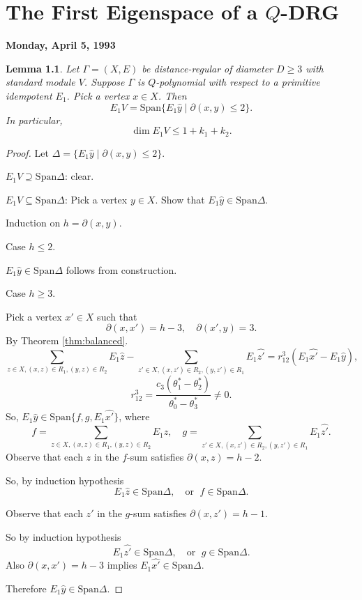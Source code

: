 \documentclass[
]{book}
\newtheorem{lemma}{Lemma}[chapter]
\theoremstyle{definition}
\theoremstyle{definition}
\theoremstyle{definition}
\theoremstyle{definition}
\theoremstyle{remark}
\begin{document}
\hypertarget{lec28}{%
\chapter{\texorpdfstring{The First Eigenspace of a \(Q\)-DRG}{The First Eigenspace of a Q-DRG}}\label{lec28}}

\textbf{Monday, April 5, 1993}

\begin{lemma}
\protect\hypertarget{lem:EV}{}\label{lem:EV}Let \(\Gamma = (X,E)\) be distance-regular of diameter \(D\geq 3\) with standard module \(V\). Suppose \(\Gamma\) is \(Q\)-polynomial with respect to a primitive idempotent \(E_1\). Pick a vertex \(x\in X\). Then
\[E_1V = \mathrm{Span}\{E_1\hat{y}\mid \partial(x,y)\leq 2\}.\]
In particular,
\[\dim E_1V \leq 1 + k_1 + k_2.\]
\end{lemma}

\begin{proof}
Let \(\Delta = \{E_1\hat{y}\mid \partial(x,y)\leq 2\}\).

\(E_1V \supseteq \mathrm{Span}\Delta\): clear.

\(E_1V \subseteq \mathrm{Span}\Delta\): Pick a vertex \(y\in X\). Show that \(E_1\hat{y}\in \mathrm{Span}\Delta\).

Induction on \(h = \partial(x,y)\).

Case \(h\leq 2\).

\(E_1\hat{y} \in \mathrm{Span}\Delta\) follows from construction.

Case \(h\geq 3\).

Pick a vertex \(x'\in X\) such that
\[\partial(x,x') = h-3, \quad \partial(x',y) = 3.\]
By Theorem \ref{thm:balanced}.
\[\sum_{z\in X, (x,z)\in R_1, (y,z)\in R_2}E_1\hat{z} - \sum_{z'\in X, (x,z')\in R_2, (y,z')\in R_1}E_1\hat{z'} = r^3_{12}(E_1\hat{x'}-E_1\hat{y}),\]
\[r^3_{12} = \frac{c_3(\theta^*_1-\theta^*_2)}{\theta^*_0-\theta^*_3} \neq 0.\]
So, \(E_1\hat{y}\in \mathrm{Span}\{f, g, E_1\hat{x'}\}\), where
\[f = \sum_{z\in X, (x,z)\in R_1, (y,z)\in R_2}E_1\hat{z}, \quad g = \sum_{z'\in X, (x,z')\in R_2, (y,z')\in R_1}E_1\hat{z'}.\]
Observe that each \(z\) in the \(f\)-sum satisfies \(\partial(x,z)=h-2\).

So, by induction hypothesis
\[E_1\hat{z}\in \mathrm{Span}\Delta, \quad \text{or }\; f\in \mathrm{Span}\Delta.\]

Observe that each \(z'\) in the \(g\)-sum satisfies \(\partial(x,z')=h-1\).

So by induction hypothesis
\[E_1\hat{z'}\in \mathrm{Span}\Delta, \quad \text{or }\; g\in \mathrm{Span}\Delta.\]
Also \(\partial(x,x') = h-3\) implies \(E_1\hat{x'}\in \mathrm{Span}\Delta\).

Therefore \(E_1\hat{y} \in \mathrm{Span}\Delta\).
\end{proof}
\end{document}
